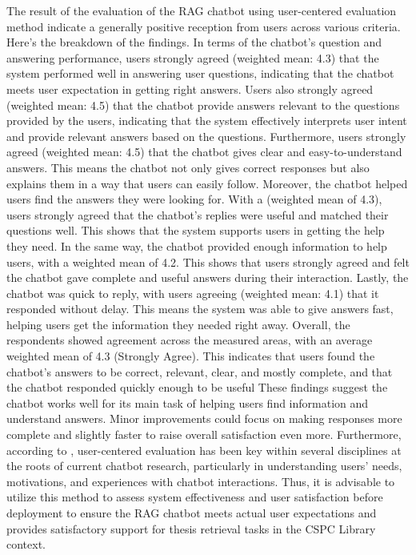 \begin{refsection}
The result of the evaluation of the RAG chatbot using user-centered evaluation method indicate a generally positive reception from users across various criteria. Here’s the breakdown of the findings. In terms of the chatbot’s question and answering performance, users strongly agreed (weighted mean: 4.3) that the system performed well in answering user questions, indicating that the chatbot meets user expectation in getting right answers. Users also strongly agreed (weighted mean: 4.5) that the chatbot provide answers relevant to the questions provided by the users, indicating that the system effectively interprets user intent and provide relevant answers based on the questions. Furthermore, users strongly agreed (weighted mean: 4.5) that the chatbot gives clear and easy-to-understand answers. This means the chatbot not only gives correct responses but also explains them in a way that users can easily follow. Moreover, the chatbot helped users find the answers they were looking for. With a (weighted mean of 4.3), users strongly agreed that the chatbot’s replies were useful and matched their questions well. This shows that the system supports users in getting the help they need. In the same way, the chatbot provided enough information to help users, with a weighted mean of 4.2. This shows that users  strongly agreed and felt the chatbot gave complete and useful answers during their interaction. Lastly, the chatbot was quick to reply, with users agreeing (weighted mean: 4.1) that it responded without delay. This means the system was able to give answers fast, helping users get the information they needed right away. Overall, the respondents showed agreement across the measured areas, with an average weighted mean of 4.3 (Strongly Agree). This indicates that users found the chatbot’s answers to be correct, relevant, clear, and mostly complete, and that the chatbot responded quickly enough to be useful These findings suggest the chatbot works well for its main task of helping users find information and understand answers. Minor improvements could focus on making responses more complete and slightly faster to raise overall satisfaction even more. Furthermore, according to \citeauthor{folstad2021future} \citeyear{folstad2021future}, user-centered evaluation has been key within several disciplines at the roots of current chatbot research, particularly in understanding users' needs, motivations, and experiences with chatbot interactions. Thus, it is advisable to utilize this method to assess system effectiveness and user satisfaction before deployment to ensure the RAG chatbot meets actual user expectations and provides satisfactory support for thesis retrieval tasks in the CSPC Library context.


\end{refsection}
